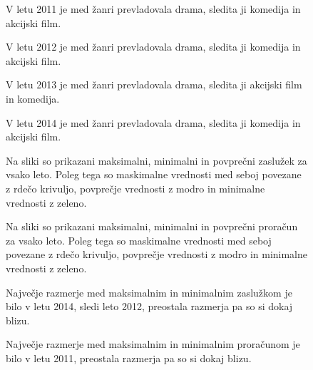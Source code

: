 \documentclass[11pt,a4paper]{article}
\begin{document}
\pagebreak
\begin{figure}[H]

\caption{V letu 2011 je med žanri prevladovala drama, sledita ji komedija in akcijski film.}
\end{figure}

\pagebreak
\begin{figure}[H]

\caption{V letu 2012 je med žanri prevladovala drama, sledita ji komedija in akcijski film.}
\end{figure}

\pagebreak
\begin{figure}[H]

\caption{V letu 2013 je med žanri prevladovala drama, sledita ji akcijski film in komedija.}
\end{figure}

\pagebreak
\begin{figure}[H]

\caption{V letu 2014 je med žanri prevladovala drama, sledita ji komedija in akcijski film.}
\end{figure}



\pagebreak
\begin{figure}[H]

\caption{Na sliki so prikazani maksimalni, minimalni in povprečni zaslužek za vsako leto. Poleg tega so maskimalne vrednosti med seboj povezane z rdečo krivuljo, povprečje vrednosti z modro in minimalne vrednosti z zeleno.}
\end{figure}

\pagebreak
\begin{figure}[H]

\caption{Na sliki so prikazani maksimalni, minimalni in povprečni proračun za vsako leto. Poleg tega so maskimalne vrednosti med seboj povezane z rdečo krivuljo, povprečje vrednosti z modro in minimalne vrednosti z zeleno.}
\end{figure}

\pagebreak
\begin{figure}[H]

\caption{Največje razmerje med maksimalnim in minimalnim zaslužkom je bilo v letu 2014, sledi leto 2012, preostala razmerja pa so si dokaj blizu.}
\end{figure}

\pagebreak
\begin{figure}[H]

\caption{Največje razmerje med maksimalnim in minimalnim proračunom je bilo v letu 2011, preostala razmerja pa so si dokaj blizu.}
\end{figure}

\pagebreak
\begin{center}
\end{center}
\end{document}
